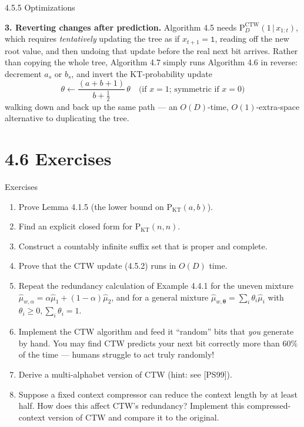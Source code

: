 \documentclass[aspectratio=169,10pt]{beamer}
\newcommand{\PKT}{\mathrm{P}_{\mathrm{KT}}}
\begin{document}
\begin{frame}[allowframebreaks]{4.5.5 Optimizations}
\framebreak

\textbf{3. Reverting changes after prediction.} Algorithm 4.5 needs
$\mathrm{P}_D^{\mathrm{CTW}}(1\,|\,x_{1:t})$, which requires \emph{tentatively} updating the
tree as if $x_{t+1}=\mathtt1$, reading off the new root value, and then undoing that update
before the real next bit arrives. Rather than copying the whole tree, Algorithm 4.7 simply
runs Algorithm 4.6 in reverse: decrement $a_s$ or $b_s$, and invert the KT-probability update
$$
\theta \leftarrow \frac{(a+b+1)}{b+\tfrac12}\,\theta \quad\text{(if $x=1$; symmetric if $x=0$)}
$$
walking down and back up the same path — an $O(D)$-time, $O(1)$-extra-space alternative to
duplicating the tree.
\end{frame}

\section{4.6 Exercises}
\begin{frame}{Exercises}
\begin{enumerate}
\item [C32m] Prove Lemma 4.1.5 (the lower bound on $\PKT(a,b)$).
\item [C10] Find an explicit closed form for $\PKT(n,n)$.
\item [C10] Construct a countably infinite suffix set that is proper and complete.
\item [C15] Prove that the CTW update (4.5.2) runs in $O(D)$ time.
\item [C15] Repeat the redundancy calculation of Example 4.4.1 for the uneven mixture
$\hat\mu_{w,\alpha}=\alpha\hat\mu_1+(1-\alpha)\hat\mu_2$, and for a general mixture
$\hat\mu_{w,\boldsymbol\theta}=\sum_i\theta_i\hat\mu_i$ with $\theta_i\ge0,\sum_i\theta_i=1$.
\item [C30i] Implement the CTW algorithm and feed it ``random'' bits that \emph{you}
generate by hand. You may find CTW predicts your next bit correctly more than $60\%$ of the
time — humans struggle to act truly randomly!
\item [C35] Derive a multi-alphabet version of CTW (hint: see [PS99]).
\item [C32] Suppose a fixed context compressor can reduce the context length by at least
half. How does this affect CTW's redundancy? Implement this compressed-context version of
CTW and compare it to the original.
\end{enumerate}
\end{frame}
\end{document}
